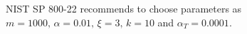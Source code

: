 %
NIST SP 800-22 recommends to choose parameters as $m=1000,\,\alpha=0.01,\,\xi=3, \,k=10$ and $\alpha_T=0.0001$.
%
%
%
% 
